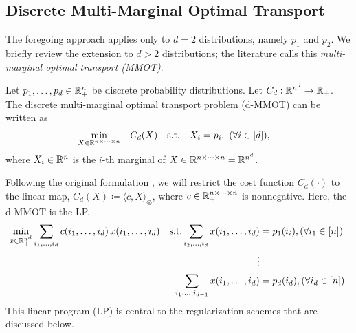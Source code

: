 \subsection{Discrete Multi-Marginal Optimal Transport}

The foregoing approach 
applies only to $d=2$ distributions, namely $p_1$ and $p_2$. We briefly review the extension 
to $d>2$ distributions; 
the literature calls this \textit{multi-marginal optimal transport (MMOT)}.%

\begin{definition}\label{def:dmmot}
Let $p_1, \ldots, p_d\in\mathbb{R}^n_{+}$ be discrete probability distributions. %
Let $C_d : \mathbb{R}^{n^{d}}\rightarrow \mathbb{R}_{+}$. 
The discrete multi-marginal optimal transport problem (d-MMOT) can be written as
\begin{align*}%
    &\underset{{X \in \RR^{n\times \cdots \times n}}}{\textrm{min}}\quad C_d(X) \quad \textrm{s.t.}\quad X_i = p_i,\ (\forall i\in [d]),
\end{align*}
where $X_i \in \mathbb{R}^n$ is the $i$-th marginal of  $X \in \mathbb{R}^{n\times \cdots \times n}=\mathbb{R}^{n^{d}}$.
\end{definition}
Following the original formulation \citep{kantorovich1942}, we will restrict the cost function $C_d(\cdot)$ to the linear map, $C_d(X) \coloneqq \langle c, X \rangle_{\otimes}$, where $c \in \mathbb{R}_{+}^{n\times \cdots \times n}$ is nonnegative.
Here, the d-MMOT is the LP,
\begin{align}\label{eq:gemd}\begin{aligned}
    \underset{x\in\mathbb{R}^{n^{d}}_{+}} {\textrm{min}}
    \sum_{i_1,\ldots,i_d} c(i_1,\ldots, i_d)\, x(i_1,\ldots,i_d) \quad \textrm{s.t.}
    \sum_{i_2,\ldots,i_d} x(i_1,\ldots,i_d) &= p_1(i_i), (\forall i_1\in[n])\\
    \qquad\vdots\\
    \sum_{i_1,\ldots,i_{d-1}} x(i_1,\ldots,i_d) &= p_{d}(i_{d}), (\forall i_d\in[n]).
    \end{aligned}
\end{align}
This linear program (LP) is central to the regularization schemes that are discussed below.
